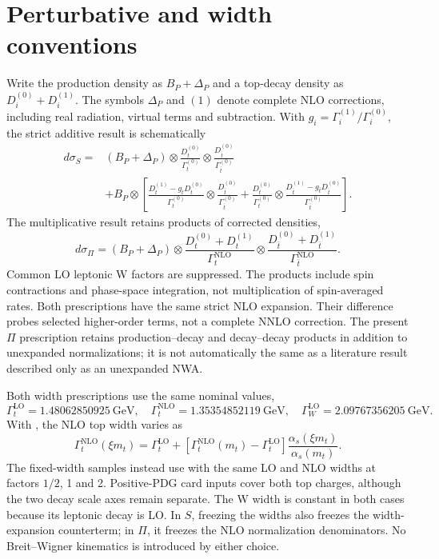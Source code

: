 \documentclass[11pt,a4paper]{article}
\newcommand{\code}[1]{\texttt{\detokenize{#1}}}
\begin{document}
\section{Perturbative and width conventions}
Write the production density as $B_P+\Delta_P$ and a top-decay density as
$D_i^{(0)}+D_i^{(1)}$. The symbols $\Delta_P$ and $(1)$ denote complete
NLO corrections, including real radiation, virtual terms and subtraction.
With $g_i=\Gamma_i^{(1)}/\Gamma_i^{(0)}$, the strict additive result is
schematically
\begin{align}
 d\sigma_S={}&(B_P+\Delta_P)\otimes
 \frac{D_t^{(0)}}{\Gamma_t^{(0)}}\otimes
 \frac{D_{\bar t}^{(0)}}{\Gamma_{\bar t}^{(0)}}\nonumber\\
 &+B_P\otimes\left[
 \frac{D_t^{(1)}-g_tD_t^{(0)}}{\Gamma_t^{(0)}}\otimes
 \frac{D_{\bar t}^{(0)}}{\Gamma_{\bar t}^{(0)}}
 +\frac{D_t^{(0)}}{\Gamma_t^{(0)}}\otimes
 \frac{D_{\bar t}^{(1)}-g_{\bar t}D_{\bar t}^{(0)}}{\Gamma_{\bar t}^{(0)}}
 \right].
\end{align}
The multiplicative result retains products of corrected densities,
\begin{equation}
 d\sigma_\Pi=(B_P+\Delta_P)\otimes
 \frac{D_t^{(0)}+D_t^{(1)}}{\Gamma_t^{\mathrm{NLO}}}\otimes
 \frac{D_{\bar t}^{(0)}+D_{\bar t}^{(1)}}{\Gamma_{\bar t}^{\mathrm{NLO}}}.
\end{equation}
Common LO leptonic W factors are suppressed. The products include spin
contractions and phase-space integration, not multiplication of
spin-averaged rates. Both prescriptions have the same strict NLO
expansion. Their difference probes selected higher-order terms, not a
complete NNLO correction. The present $\Pi$ prescription retains
production--decay and decay--decay products in addition to unexpanded
normalizations; it is not automatically the same as a literature result
described only as an unexpanded NWA.

Both width prescriptions use the same nominal values,
\begin{equation}
 \Gamma_t^{\mathrm{LO}}=1.48062850925~\mathrm{GeV},\quad
 \Gamma_t^{\mathrm{NLO}}=1.35354852119~\mathrm{GeV},\quad
 \Gamma_W^{\mathrm{LO}}=2.09767356205~\mathrm{GeV}.
\end{equation}
With \code{AUTO}, the NLO top width varies as
\begin{equation}
 \Gamma_t^{\mathrm{NLO}}(\xi m_t)=\Gamma_t^{\mathrm{LO}}+
 [\Gamma_t^{\mathrm{NLO}}(m_t)-\Gamma_t^{\mathrm{LO}}]
 \frac{\alpha_s(\xi m_t)}{\alpha_s(m_t)}.
\end{equation}
The fixed-width samples instead use \code{EXPLICIT} with the same LO
and NLO widths at factors $1/2$, 1 and 2. Positive-PDG card inputs cover
both top charges, although the two decay scale axes remain separate.
The W width is constant in both cases because its leptonic decay is LO.
In $S$, freezing the widths also freezes the width-expansion
counterterm; in $\Pi$, it freezes the NLO normalization denominators.
No Breit--Wigner kinematics is introduced by either choice.
\end{document}
